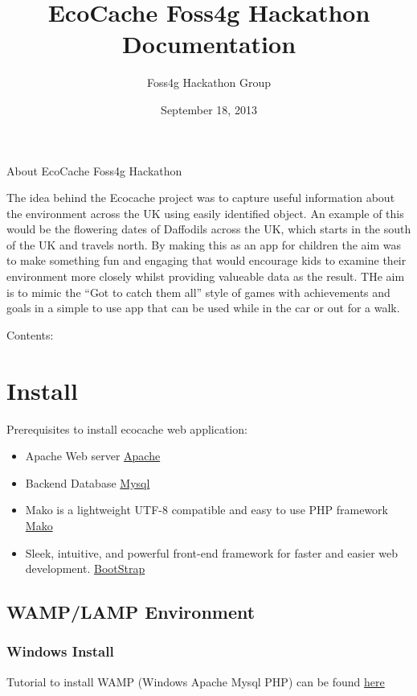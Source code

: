 \documentclass[letterpaper,10pt,english]{sphinxmanual}
\title{EcoCache Foss4g Hackathon Documentation}
\date{September 18, 2013}
\author{Foss4g Hackathon Group}
\begin{document}
\maketitle
\tableofcontents
{}\label{index::doc}


About EcoCache Foss4g Hackathon

The idea behind the Ecocache project was to capture useful information about the environment across the UK using easily identified object.
An example of this would be the flowering dates of Daffodils across the UK, which starts in the south of the UK and travels north.
By making this as an app for children the aim was to make something fun and engaging that would encourage kids to examine their
environment more closely whilst providing valueable data as the result.
THe aim is to mimic the ``Got to catch them all'' style of games with achievements and goals in a simple to use app that can be used
while in the car or out for a walk.

Contents:


\chapter{Install}
\label{prerequisites:welcome-to-ecocache-foss4g-hackathon-s-documentation}\label{prerequisites::doc}\label{prerequisites:install}
Prerequisites to install ecocache web application:
\begin{itemize}
\item {} 
Apache Web server \href{http://www.apache.org}{Apache}

\item {} 
Backend Database \href{http://www.mysql.com}{Mysql}

\item {} 
Mako is a lightweight UTF-8 compatible and easy to use PHP framework \href{http://makoframework.com}{Mako}

\item {} 
Sleek, intuitive, and powerful front-end framework for faster and easier web development. \href{http://getbootstrap.com}{BootStrap}

\end{itemize}


\section{WAMP/LAMP Environment}
\label{prerequisites:wamp-lamp-environment}

\subsection{Windows Install}
\label{prerequisites:windows-install}
Tutorial to install  WAMP (Windows Apache Mysql PHP) can be found  \href{http://www.wampserver.com/en/}{here}
\end{document}
